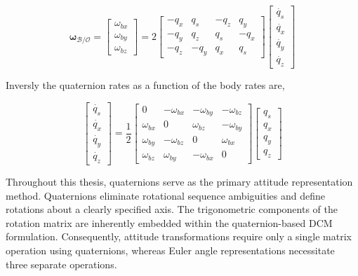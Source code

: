 \begin{equation}
    \mathbf{\omega}_\mathcal{B/O} = 
    \begin{bmatrix}
        \omega_{bx} \\ \omega_{by} \\ \omega_{bz}
    \end{bmatrix}
    = 2
    \begin{bmatrix}
       -q_x & q_s & -q_z & q_y \\
       -q_y & q_z & q_s & -q_x \\
       -q_z & -q_y & q_x & q_s 
    \end{bmatrix}
    \begin{bmatrix}
        \dot{q_s} \\ \dot{q_x} \\ \dot{q_y} \\ \dot{q_z}
    \end{bmatrix}
\end{equation}

\noindent Inversly the quaternion rates as a function of the body rates are,

\begin{equation}
    \begin{bmatrix}
        \dot{q_s} \\ \dot{q_x} \\ \dot{q_y} \\ \dot{q_z}
    \end{bmatrix}
    =
    \frac{1}{2}
    \begin{bmatrix}
        0 & -\omega_{bx} & -\omega_{by} & -\omega_{bz}\\
        \omega_{bx} & 0 & \omega_{bz} & -\omega_{by}\\
        \omega_{by} & -\omega_{bz} & 0 & \omega_{bx}\\
        \omega_{bz} & \omega_{by} & -\omega_{bx} & 0 
    \end{bmatrix}
    \begin{bmatrix}
        q_s \\ q_x \\ q_y \\ q_z
    \end{bmatrix}
\end{equation}

\noindent Throughout this thesis, quaternions serve as the primary attitude representation method. Quaternions eliminate rotational sequence 
ambiguities and define rotations about a clearly specified axis. The trigonometric components of the rotation matrix are inherently embedded 
within the quaternion-based DCM formulation. Consequently, attitude transformations require only a single matrix operation using quaternions, whereas 
Euler angle representations necessitate three separate operations.


